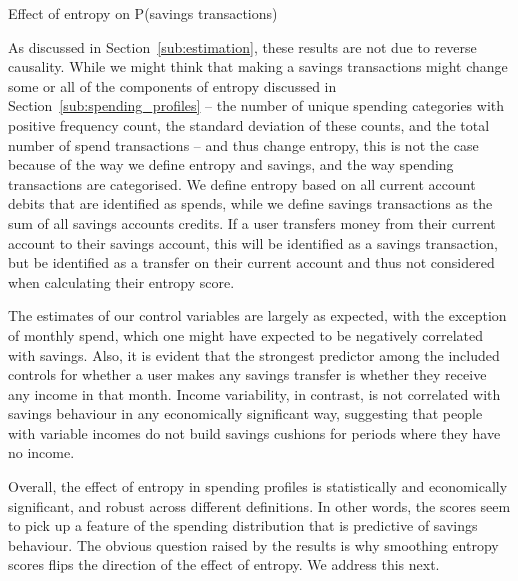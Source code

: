 \begin{landscape}
    \begin{table}[ht]
        \centering\scriptsize
        \caption{Effect of entropy on P(savings transactions)}
        \label{tab:main}
        
    \end{table}
\end{landscape}

As discussed in Section~\ref{sub:estimation}, these results are not due to
reverse causality. While we might think that making a savings transactions
might change some or all of the components of entropy discussed in
Section~\ref{sub:spending_profiles} -- the number of unique spending categories
with positive frequency count, the standard deviation of these counts, and the
total number of spend transactions -- and thus change entropy, this is not the
case because of the way we define entropy and savings, and the way spending
transactions are categorised. We define entropy based on all current account
debits that are identified as spends, while we define savings transactions as
the sum of all savings accounts credits. If a user transfers money from their
current account to their savings account, this will be identified as a savings
transaction, but be identified as a transfer on their current account and thus
not considered when calculating their entropy score.

The estimates of our control variables are largely as expected, with the
exception of monthly spend, which one might have expected to be negatively
correlated with savings. Also, it is evident that the strongest predictor among
the included controls for whether a user makes any savings transfer is whether
they receive any income in that month. Income variability, in contrast, is not
correlated with savings behaviour in any economically significant way,
suggesting that people with variable incomes do not build savings cushions for
periods where they have no income.

Overall, the effect of entropy in spending profiles is statistically and
economically significant, and robust across different definitions. In other
words, the scores seem to pick up a feature of the spending distribution that
is predictive of savings behaviour. The obvious question raised by the results
is why smoothing entropy scores flips the direction of the effect of entropy.
We address this next.


